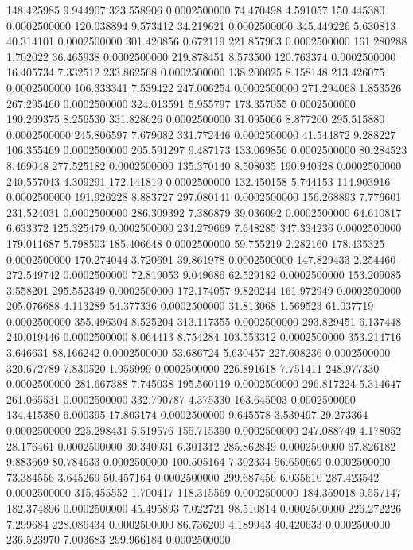 148.425985 9.944907 323.558906 0.0002500000
74.470498 4.591057 150.445380 0.0002500000
120.038894 9.573412 34.219621 0.0002500000
345.449226 5.630813 40.314101 0.0002500000
301.420856 0.672119 221.857963 0.0002500000
161.280288 1.702022 36.465938 0.0002500000
219.878451 8.573500 120.763374 0.0002500000
16.405734 7.332512 233.862568 0.0002500000
138.200025 8.158148 213.426075 0.0002500000
106.333341 7.539422 247.006254 0.0002500000
271.294068 1.853526 267.295460 0.0002500000
324.013591 5.955797 173.357055 0.0002500000
190.269375 8.256530 331.828626 0.0002500000
31.095066 8.877200 295.515880 0.0002500000
245.806597 7.679082 331.772446 0.0002500000
41.544872 9.288227 106.355469 0.0002500000
205.591297 9.487173 133.069856 0.0002500000
80.284523 8.469048 277.525182 0.0002500000
135.370140 8.508035 190.940328 0.0002500000
240.557043 4.309291 172.141819 0.0002500000
132.450158 5.744153 114.903916 0.0002500000
191.926228 8.883727 297.080141 0.0002500000
156.268893 7.776601 231.524031 0.0002500000
286.309392 7.386879 39.036092 0.0002500000
64.610817 6.633372 125.325479 0.0002500000
234.279669 7.648285 347.334236 0.0002500000
179.011687 5.798503 185.406648 0.0002500000
59.755219 2.282160 178.435325 0.0002500000
170.274044 3.720691 39.861978 0.0002500000
147.829433 2.254460 272.549742 0.0002500000
72.819053 9.049686 62.529182 0.0002500000
153.209085 3.558201 295.552349 0.0002500000
172.174057 9.820244 161.972949 0.0002500000
205.076688 4.113289 54.377336 0.0002500000
31.813068 1.569523 61.037719 0.0002500000
355.496304 8.525204 313.117355 0.0002500000
293.829451 6.137448 240.019446 0.0002500000
8.064413 8.754284 103.553312 0.0002500000
353.214716 3.646631 88.166242 0.0002500000
53.686724 5.630457 227.608236 0.0002500000
320.672789 7.830520 1.955999 0.0002500000
226.891618 7.751411 248.977330 0.0002500000
281.667388 7.745038 195.560119 0.0002500000
296.817224 5.314647 261.065531 0.0002500000
332.790787 4.375330 163.645003 0.0002500000
134.415380 6.000395 17.803174 0.0002500000
9.645578 3.539497 29.273364 0.0002500000
225.298431 5.519576 155.715390 0.0002500000
247.088749 4.178052 28.176461 0.0002500000
30.340931 6.301312 285.862849 0.0002500000
67.826182 9.883669 80.784633 0.0002500000
100.505164 7.302334 56.650669 0.0002500000
73.384556 3.645269 50.457164 0.0002500000
299.687456 6.035610 287.423542 0.0002500000
315.455552 1.700417 118.315569 0.0002500000
184.359018 9.557147 182.374896 0.0002500000
45.495893 7.022721 98.510814 0.0002500000
226.272226 7.299684 228.086434 0.0002500000
86.736209 4.189943 40.420633 0.0002500000
236.523970 7.003683 299.966184 0.0002500000
